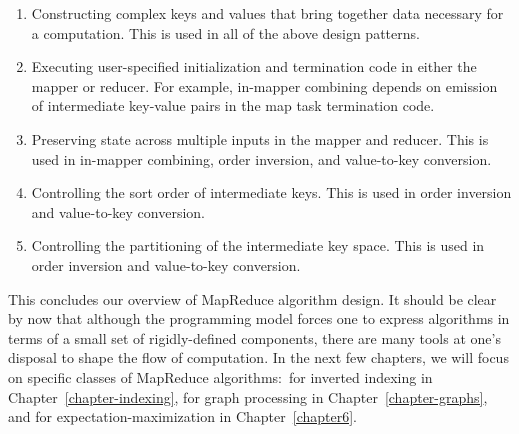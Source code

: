 \begin{enumerate}

\item Constructing complex keys and values that bring together data
  necessary for a computation.  This is used in all of the above
  design patterns.

\item Executing user-specified initialization and termination code in
  either the mapper or reducer.  For example, in-mapper combining
  depends on emission of intermediate key-value pairs in the map task
  termination code.

\item Preserving state across multiple inputs in the mapper and
  reducer.  This is used in in-mapper combining, order inversion, and
  value-to-key conversion.

\item Controlling the sort order of intermediate keys.  This is used
  in order inversion and value-to-key conversion.

\item Controlling the partitioning of the intermediate key space.
  This is used in order inversion and value-to-key conversion.

\end{enumerate}

\noindent This concludes our overview of MapReduce algorithm design.
It should be clear by now that although the programming model forces
one to express algorithms in terms of a small set of rigidly-defined
components, there are many tools at one's disposal to shape the flow
of computation.  In the next few chapters, we will focus on specific
classes of MapReduce algorithms:\ for inverted indexing in
Chapter~\ref{chapter-indexing}, for graph processing in
Chapter~\ref{chapter-graphs}, and for expectation-maximization in
Chapter~\ref{chapter6}.
